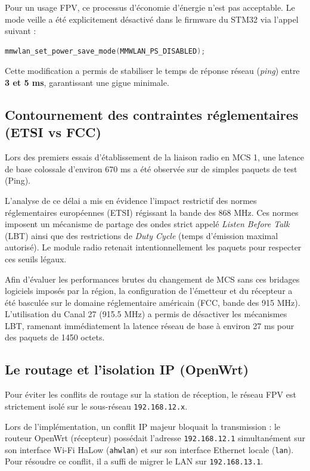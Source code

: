 Pour un usage FPV, ce processus d'économie d'énergie n'est pas acceptable. Le mode veille a été explicitement désactivé 
dans le firmware du STM32 via l'appel suivant :
\begin{lstlisting}[language=C]
mmwlan_set_power_save_mode(MMWLAN_PS_DISABLED);
\end{lstlisting}
Cette modification a permis de stabiliser le temps de réponse réseau (\textit{ping}) entre \textbf{3 et 5 ms}, 
garantissant une gigue minimale.

\subsection{Contournement des contraintes réglementaires (ETSI vs FCC)}
Lors des premiers essais d'établissement de la liaison radio en MCS 1, une latence de base colossale 
d'environ 670 ms a été observée sur de simples paquets de test (Ping). 

L'analyse de ce délai a mis en évidence l'impact restrictif des normes réglementaires européennes (ETSI) 
régissant la bande des 868 MHz. Ces normes imposent un mécanisme de partage des ondes strict appelé 
\textit{Listen Before Talk} (LBT) ainsi que des restrictions de \textit{Duty Cycle} (temps d'émission 
maximal autorisé). Le module radio retenait intentionnellement les paquets pour respecter ces seuils 
légaux.

Afin d'évaluer les performances brutes du changement de MCS sans ces bridages logiciels imposés par la 
région, la configuration de l'émetteur et du récepteur a été basculée sur le domaine réglementaire 
américain (FCC, bande des 915 MHz). L'utilisation du Canal 27 (915.5 MHz) a permis de désactiver 
les mécanismes LBT, ramenant immédiatement la latence réseau de base à environ 27 ms pour des 
paquets de 1450 octets.

\subsection{Le routage et l'isolation IP (OpenWrt)}
Pour éviter les conflits de routage sur la station de réception, le réseau FPV est strictement isolé 
sur le sous-réseau \texttt{192.168.12.x}.

Lors de l'implémentation, un conflit IP majeur bloquait la transmission : le routeur OpenWrt (récepteur) 
possédait l'adresse \texttt{192.168.12.1} simultanément sur son interface Wi-Fi HaLow (\texttt{ahwlan}) 
et sur son interface Ethernet locale (\texttt{lan}). Pour résoudre ce conflit, il a suffi de migrer le 
LAN sur \texttt{192.168.13.1}.

